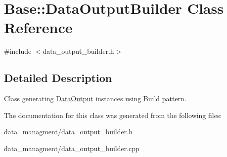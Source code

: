 \hypertarget{classBase_1_1DataOutputBuilder}{\section{Base\-:\-:Data\-Output\-Builder Class Reference}
\label{classBase_1_1DataOutputBuilder}
}


{\ttfamily \#include $<$data\-\_\-output\-\_\-builder.\-h$>$}



\subsection{Detailed Description}
Class generating \hyperlink{classBase_1_1DataOutput}{Data\-Output} instances using Build pattern. 

The documentation for this class was generated from the following files\-:\begin{DoxyCompactItemize}
\item 
data\-\_\-managment/data\-\_\-output\-\_\-builder.\-h\item 
data\-\_\-managment/data\-\_\-output\-\_\-builder.\-cpp\end{DoxyCompactItemize}
